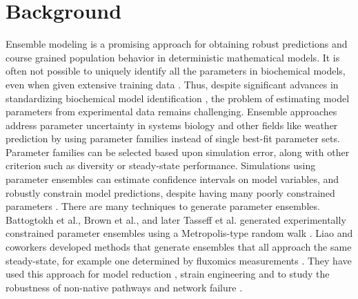 \documentclass{bmcart}
\begin{document}



\section*{Background}
Ensemble modeling is a promising approach for obtaining robust predictions and course grained population behavior in deterministic mathematical models.
It is often not possible to uniquely identify all the parameters in biochemical models, even when given extensive training data \cite{Gadkar:2005ad}.
Thus, despite significant advances in standardizing biochemical model identification \cite{Gennemark:2009on},
the problem of estimating model parameters from experimental data remains challenging.
Ensemble approaches address parameter uncertainty in systems biology and other fields like weather prediction \cite{Battogtokh:2002,Kuepfer:2007, Brown:2003,Palmer:2005}
by using parameter families instead of single best-fit parameter sets.
Parameter families can be selected based upon simulation error, along with other criterion such as diversity or steady-state performance.
Simulations using parameter ensembles can estimate confidence intervals on model variables, and robustly constrain model predictions,
despite having many poorly constrained parameters \cite{Gutenkunst2007,Song:2009b}.
There are many techniques to generate parameter ensembles.
Battogtokh et al., Brown et al., and later Tasseff et al. generated experimentally constrained parameter ensembles using a
Metropolis-type random walk \cite{Battogtokh:2002,Brown:2003,Tasseff:2010aa,Tasseff:2011aa}.
Liao and coworkers developed methods that generate ensembles that all approach the same steady-state, for example one determined by fluxomics measurements \cite{Tran:2008aa}.
They have used this approach for model reduction \cite{Tan:2011aa}, strain engineering \cite{Contador2009221,Tan:2012aa} and to study the robustness of non-native pathways and network failure \cite{Lee:2014aa}.
\end{document}
